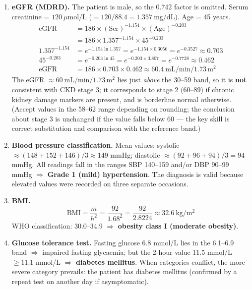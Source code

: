 \documentclass[11pt]{article}
\begin{document}
\begin{corrige}
\begin{enumerate}
\item \textbf{eGFR (MDRD).} The patient is male, so the 0.742 factor is omitted. Serum creatinine = $120\ \mu\mathrm{mol/L}$ ($= 120/88.4 = 1.357\ \mathrm{mg/dL}$). Age = 45 years.
\begin{align*}
\text{eGFR} &= 186 \times (\text{Scr})^{-1.154} \times (\text{Age})^{-0.203} \\
&= 186 \times 1.357^{-1.154} \times 45^{-0.203} \\
1.357^{-1.154} &= e^{-1.154 \ln 1.357} = e^{-1.154 \times 0.3056} = e^{-0.3527} \approx 0.703 \\
45^{-0.203} &= e^{-0.203 \ln 45} = e^{-0.203 \times 3.807} = e^{-0.7728} \approx 0.462 \\
\text{eGFR} &= 186 \times 0.703 \times 0.462 \approx 60.4\ \mathrm{mL/min/1.73\,m^2}
\end{align*}
The eGFR $\approx 60\ \mathrm{mL/min/1.73\,m^2}$ lies just \emph{above} the 30--59 band, so it is \textbf{not} consistent with CKD stage 3; it corresponds to stage 2 (60--89) if chronic kidney damage markers are present, and is borderline normal otherwise. (Accept values in the 58--62 range depending on rounding; the conclusion about stage 3 is unchanged if the value falls below 60 — the key skill is correct substitution and comparison with the reference band.)

\item \textbf{Blood pressure classification.} Mean values: systolic $\approx (148+152+146)/3 \approx 149$ mmHg; diastolic $\approx (92+96+94)/3 = 94$ mmHg. All readings fall in the ranges SBP 140--159 and/or DBP 90--99 mmHg $\Rightarrow$ \textbf{Grade 1 (mild) hypertension}. The diagnosis is valid because elevated values were recorded on three separate occasions.

\item \textbf{BMI.}
\[ \text{BMI} = \frac{m}{h^2} = \frac{92}{1.68^2} = \frac{92}{2.8224} \approx 32.6\ \mathrm{kg/m^2} \]
WHO classification: 30.0--34.9 $\Rightarrow$ \textbf{obesity class I (moderate obesity)}.

\item \textbf{Glucose tolerance test.} Fasting glucose 6.8 mmol/L lies in the 6.1--6.9 band $\Rightarrow$ impaired fasting glycaemia; but the 2-hour value 11.5 mmol/L $\ge 11.1$ mmol/L $\Rightarrow$ \textbf{diabetes mellitus}. When categories conflict, the more severe category prevails: the patient has diabetes mellitus (confirmed by a repeat test on another day if asymptomatic).
\end{enumerate}
\end{corrige}
\end{document}
